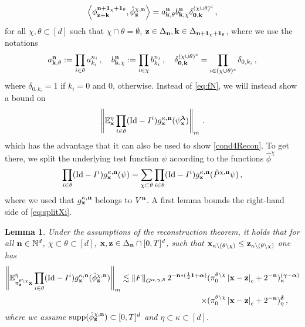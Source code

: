 \documentclass[12pt]{article}
\numberwithin{equation}{section}
\theoremstyle{plain}
\newtheorem{lemma}[theorem]{Lemma}
\theoremstyle{definition}
\newcommand{\compAbs}[1]{\left\vert#1\right\vert_{\text{c}}}
\newcommand{\scalar}[1]{\left\langle #1 \right\rangle}
\newcommand{\norm}[1]{\left\Vert #1\right\Vert}
\newcommand{\Id}{\mbox{Id}}
\def\bE{\mathbb{E}}\def\bW{\mathbb{W}}
\def\fk{\mathbf k}\def\fl{\mathbf l}
\def\falpha{{\boldsymbol\alpha}}
\def\fgamma{{\boldsymbol\gamma}}
\def\fdelta{{\boldsymbol\delta}}
\def\flambda{{\boldsymbol\lambda}}
\def\foo{{\boldsymbol 0}}
\def\fone{{\boldsymbol 1}}
\def\supp{\mbox{supp}}
\begin{document}
\begin{equation}\label{eq:scalarProductWavelets}
\scalar{\phi^{\fn+\fone_\chi+\fone_\theta}_{\fz+\fk} , \hat\phi^{\chi,\fn}_\fz} = a_{\fk,\theta}^{\fn}b_{\fk,\chi}^{\fn}\delta_{\foo,\fk}^{(\chi\cup\theta)^c}\,, 
\end{equation}
for all $\chi,\theta\subset[d]$ such that $\chi\cap \theta=\emptyset$, $ \fz\in\Delta_\fn, \fk\in\Delta_{\fn+\fone_\chi+\fone_\theta}$, where we use the notations
\[a_{\fk,\theta}^{\fn} := \prod_{i\in\theta} a_{k_i}^{n_i}\,, \quad b_{\fk,\chi}^{\fn} := \prod_{i\in\chi}b_{k_i}^{n_i}\,, \quad  \delta_{\foo,\fk}^{(\chi\cup\theta)^c} = \prod_{i\in(\chi\cup\theta)^c}\delta_{0,k_i}\,,\] where $\delta_{0,k_i} = 1$ if $k_i = 0$ and $0$, otherwise. Instead of \eqref{eq:fN}, we will instead show a bound on
%
\begin{equation*}
    \norm{\bE^\eta_\fx \prod_{i\in\theta}(\Id-I^i)g^{\kappa,\fn}_\fx(\psi_\fx^\flambda)}_m\,.
\end{equation*}
%
which has the advantage that it can also be used to show \eqref{cond4Recon}. To get there, we split the underlying test function $\psi $ according to the functions  $\hat{\phi}^{\chi}$
\begin{equation}\label{eq:splitXi}
\prod_{i\in\theta}(\Id-I^i)g^{\kappa,\fn}_\fx(\psi) = \sum_{\chi\subset\theta}\prod_{i\in\theta}(\Id-I^i)g^{\kappa,\fn}_\fx(\hat P^{\chi,\fn}\psi)\,,
\end{equation}
where we used that $g^{\kappa, \mathbf n}_\mathbf x$ belongs to $V^{\mathbf n}$. A first  lemma bounds the right-hand side of \eqref{eq:splitXi}.

\begin{lemma}\label{lem:technicalBoundg}
    Under the assumptions of the reconstruction theorem, it holds that for all $\mathbf n\in\mathbb{N}^d$, $\chi\subset\theta\subset[d]$, $\mathbf x, \mathbf z\in\Delta_{\mathbf n}\cap[0,T]^d$, such that $\mathbf x_{\kappa\setminus(\theta\setminus\chi)}\le \mathbf z_{\kappa\setminus(\theta\setminus\chi)}$  one has
    \begin{align*}
\norm{\bE^\eta_{\pi_\fz^{\theta\setminus\chi}\fx}\prod_{i\in\theta}(\Id-I^i)g_\fx^{\kappa,\fn}(\hat\phi^{\chi,\fn}_\fz)}_m\lesssim \norm{F}_{G^{\falpha,\fgamma,\fdelta}}2^{-\fn*(\frac 12\fone+\falpha)}&(\pi_0^{\theta\setminus\chi}\compAbs{\fx-\fz}+2^{-\fn})^{(\fgamma-\falpha)}_{\kappa}\\ \times&(\pi_0^{\theta\setminus\chi}\compAbs{\fx-\fz}+2^{-\fn})^{\fdelta}_{\eta}\,,
    \end{align*}
 where we assume $\supp(\hat\phi_\fz^{\chi,\fn})\subset[0,T]^d$ and  $\eta\subset\kappa\subset[d]$.
\end{lemma}
\end{document}
